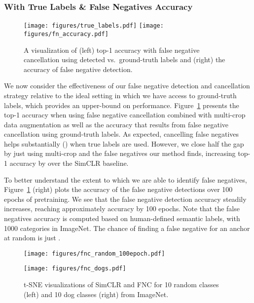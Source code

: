 \documentclass[10pt,twocolumn,letterpaper]{article}
\begin{document}
\subsubsection{With True Labels \& False Negatives Accuracy}
\begin{figure}[!b]
    \vspace{-5pt}
    \centering
    \texttt{[image: figures/true\_labels.pdf]}\hfil
    \texttt{[image: figures/fn\_accuracy.pdf]}    
\caption{A visualization of (left) top-1 accuracy with false negative cancellation using detected vs.\ ground-truth labels and (right) the accuracy of false negative detection.} \label{fig:fn_acc}
\end{figure}
We now consider the effectiveness of our false negative detection and cancellation strategy relative to the ideal setting in which we have access to ground-truth labels, which provides an upper-bound on performance. Figure~\ref{fig:fn_acc} presents the top-1 accuracy when using false negative cancellation combined with multi-crop data augmentation as well as the accuracy that results from false negative cancellation using ground-truth labels. As expected, cancelling false negatives helps substantially () when true labels are used. However, we close half the gap by just using multi-crop and the false negatives our method finds, increasing top-1 accuracy by  over the SimCLR baseline.

To better understand the extent to which we are able to identify false negatives, Figure~\ref{fig:fn_acc} (right) plots the accuracy of the false negative detections over 100 epochs of pretraining. We see that the false negative detection accuracy steadily increases, reaching approximately  accuracy by 100 epochs. Note that the false negatives accuracy is computed based on human-defined semantic labels, with 1000 categories in ImageNet. The chance of finding a false negative for an anchor at random is just .


\begin{figure}[t]
    \vspace{-9pt}
    \hfill
    \begin{minipage}[t]{0.48\linewidth}
        \vspace{0pt}
        \texttt{[image: figures/fnc\_random\_100epoch.pdf]}
    \end{minipage}
    \hfill\vline\hfill
    \begin{minipage}[t]{0.48\linewidth}
        \vspace{0pt}
        \texttt{[image: figures/fnc\_dogs.pdf]}
    \end{minipage}
    \hfill
    \vspace{7pt}
    \caption{t-SNE visualizations of SimCLR and FNC for 10 random classes (left) and 10 dog classes (right) from ImageNet.}
    \label{fig:tsne}
    \vspace{-10pt}
\end{figure}
\end{document}
